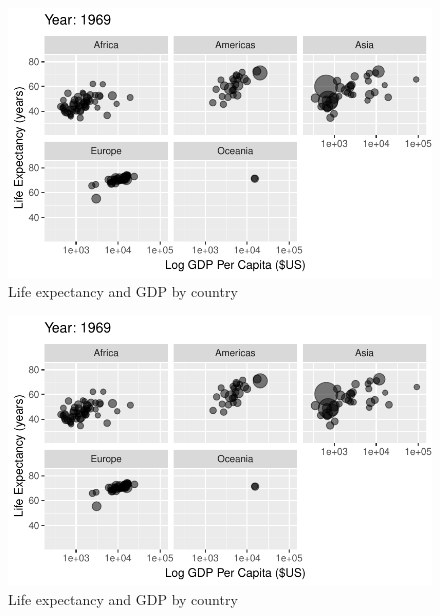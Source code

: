 \documentclass[
  letterpaper,
  DIV=11,
  numbers=noendperiod]{scrreport}
\theoremstyle{definition}
\theoremstyle{remark}
\begin{document}
\begin{figure}

{\centering \includegraphics{index_files/figure-pdf/fig-anim-lifegdp-31.pdf}

}

\caption{\label{fig-anim-lifegdp-31}Life expectancy and GDP by country}

\end{figure}

\begin{figure}

{\centering \includegraphics{index_files/figure-pdf/fig-anim-lifegdp-32.pdf}

}

\caption{\label{fig-anim-lifegdp-32}Life expectancy and GDP by country}

\end{figure}
\end{document}

